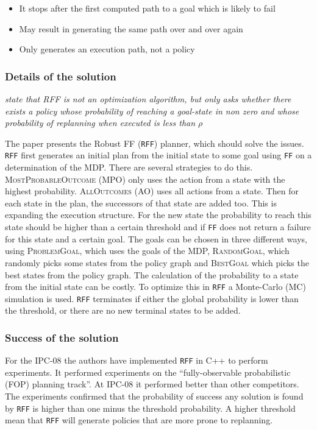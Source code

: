 \documentclass[runningheads,a4paper]{llncs}
\begin{document}
\begin{itemize}
	\item It stops after the first computed path to a goal which is likely to fail
	\item May result in generating the same path over and over again
	\item Only generates an execution path, not a policy
\end{itemize}



\subsubsection{Details of the solution}

\emph{state that RFF is not an optimization algorithm, but only asks whether
there exists a policy whose probability of reaching a goal-state in non zero
and whose probability of replanning when executed is less than $\rho$}

The paper presents the Robust FF (\texttt{RFF}) planner, which should solve the
issues. \texttt{RFF} first generates an initial plan from the initial state to
some goal using \texttt{FF} on a determination of the MDP\@. There are several
strategies to do this. \textsc{MostProbableOutcome} (MPO) only uses the action
from a state with the highest probability. \textsc{AllOutcomes} (AO) uses all
actions from a state. Then for each state in the plan, the successors of that
state are added too. This is expanding the execution structure. For the new
state the probability to reach this state should be higher than a certain
threshold and if \texttt{FF} does not return a failure for this state and a
certain goal. The goals can be chosen in three different ways, using
\textsc{ProblemGoal}, which uses the goals of the MDP, \textsc{RandomGoal},
which randomly picks some states from the policy graph and \textsc{BestGoal}
which picks the best states from the policy graph. The calculation of the
probability to a state from the initial state can be costly. To optimize this
in \texttt{RFF} a Monte-Carlo (MC) simulation is used. \texttt{RFF} terminates
if either the global probability is lower than the threshold, or there are no
new terminal states to be added.


\subsubsection{Success of the solution}

For the IPC-08 the authors have implemented \texttt{RFF} in C++ to perform
experiments. It performed experiments on the ``fully-observable probabilistic
(FOP) planning track''. At IPC-08 it performed better than other competitors.
The experiments confirmed that the probability of success any solution is found
by \texttt{RFF} is higher than one minus the threshold probability. A higher
threshold mean that \texttt{RFF} will generate policies that are more prone to
replanning.
\end{document}
